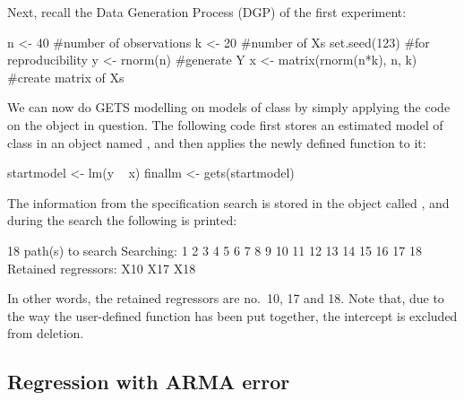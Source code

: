%
Next, recall the Data Generation Process (DGP) of the first experiment:
%
\begin{example}
  n <- 40 #number of observations
  k <- 20 #number of Xs
  set.seed(123) #for reproducibility
  y <- rnorm(n) #generate Y
  x <- matrix(rnorm(n*k), n, k) #create matrix of Xs
\end{example}
%
We can now do GETS modelling on models of class  by simply applying the code  on the object in question. The following code first stores an estimated model of class  in an object named , and then applies the newly defined function  to it:
%
\begin{example}
  startmodel <- lm(y ~ x)
  finallm <- gets(startmodel)	
\end{example}
%
The information from the specification search is stored in the object called , and during the search the following is printed:
%
\begin{example}
  18 path(s) to search
  Searching: 1 2 3 4 5 6 7 8 9 10 11 12 13 14 15 16 17 18 
  Retained regressors:
  X10 X17 X18
\end{example}
%
In other words, the retained regressors are no.\ 10, 17 and 18. Note that, due to the way the user-defined function has been put together, the intercept is excluded from deletion.

\subsection{Regression with ARMA error}

